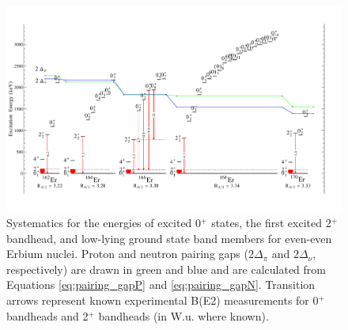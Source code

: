 \begin{landscape}
\begin{figure}[ht] 
\begin{center}
\includegraphics[height=0.8\textheight]{SciDraw_ErSystematics.pdf}
\caption{Systematics for the energies of excited 0$^+$ states, the first excited 2$^+$ bandhead, and low-lying ground state band members for even-even Erbium nuclei. Proton and neutron pairing gaps (2$\Delta_\pi$ and 2$\Delta_\nu$, respectively) are drawn in green and blue and are calculated from Equations \ref{eq:pairing_gapP} and \ref{eq:pairing_gapN}. Transition arrows represent known experimental B(E2) measurements for 0$^+$ bandheads and 2$^+$ bandheads (in W.u. where known).
\label{fig:ErSystematics}}
\end{center}
\end{figure}
\end{landscape}

